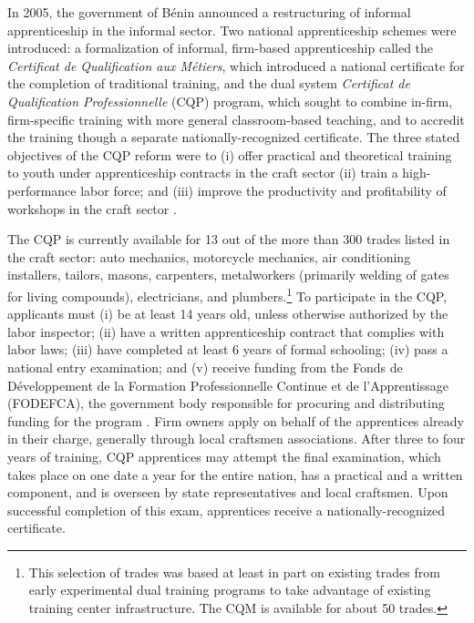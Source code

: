 \documentclass[
  a4paper, twoside, 12pt]{book}
\begin{document}
In 2005, the government of Bénin announced a restructuring of informal apprenticeship in the informal sector. Two national apprenticeship schemes were introduced: a formalization of informal, firm-based apprenticeship called the \emph{Certificat de Qualification aux Métiers}, which introduced a national certificate for the completion of traditional training, and the dual system \emph{Certificat de Qualification Professionnelle} (CQP) program, which sought to combine in-firm, firm-specific training with more general classroom-based teaching, and to accredit the training though a separate nationally-recognized certificate. The three stated objectives of the CQP reform were to (i) offer practical and theoretical training to youth under apprenticeship contracts in the craft sector (ii) train a high-performance labor force; and (iii) improve the productivity and profitability of workshops in the craft sector \autocite{davodoun2011}.

The CQP is currently available for 13 out of the more than 300 trades listed in the craft sector: auto mechanics, motorcycle mechanics, air conditioning installers, tailors, masons, carpenters, metalworkers (primarily welding of gates for living compounds), electricians, and plumbers.\footnote{This selection of trades was based at least in part on existing trades from early experimental dual training programs to take advantage of existing training center infrastructure. The CQM is available for about 50 trades.} To participate in the CQP, applicants must (i) be at least 14 years old, unless otherwise authorized by the labor inspector; (ii) have a written apprenticeship contract that complies with labor laws; (iii) have completed at least 6 years of formal schooling; (iv) pass a national entry examination; and (v) receive funding from the Fonds de Développement de la Formation Professionnelle Continue et de l'Apprentissage (FODEFCA), the government body responsible for procuring and distributing funding for the program \autocite{kofswisseconomicinstitute2017}. Firm owners apply on behalf of the apprentices already in their charge, generally through local craftsmen associations. After three to four years of training, CQP apprentices may attempt the final examination, which takes place on one date a year for the entire nation, has a practical and a written component, and is overseen by state representatives and local craftsmen. Upon successful completion of this exam, apprentices receive a nationally-recognized certificate.
\end{document}
